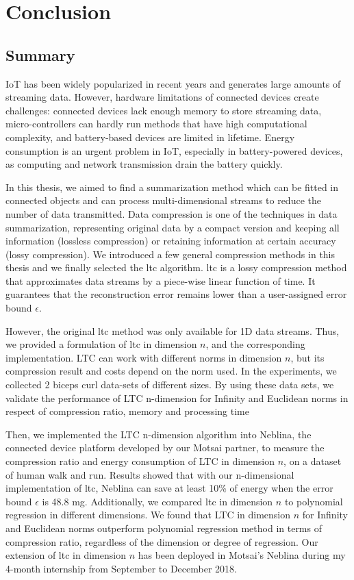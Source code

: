\chapter{Conclusion}


\section{Summary}


IoT has been widely popularized in recent years and generates large amounts of
streaming data. However, hardware limitations of connected devices create
challenges: connected devices lack enough memory to store streaming data,
micro-controllers can hardly run methods that have high computational
complexity, and battery-based devices are limited in lifetime. Energy
consumption is an urgent problem in IoT, especially in battery-powered devices,
as computing and network transmission drain the battery quickly.

In this thesis, we aimed to find a summarization method which can be fitted
in connected objects and can process multi-dimensional streams to reduce
the number of data transmitted. Data compression is one of the techniques
in data summarization, representing original data by a compact version and
keeping all information (lossless compression) or retaining information at
certain accuracy (lossy compression). We introduced a few general
compression methods in this thesis and we finally selected the
\acrfull{ltc} algorithm. \acrshort{ltc} is a lossy compression method that
approximates data streams by a piece-wise linear function of time. It
guarantees that the reconstruction error remains lower than a user-assigned
error bound $\epsilon$. 

However, the original \acrshort{ltc} method was only available for 1D data
streams. Thus, we provided a formulation of \acrshort{ltc} in dimension $n$, and
the corresponding implementation. LTC can work with different norms in dimension
$n$, but its compression result and costs depend on the norm used. In the
experiments, we collected 2 biceps curl data-sets of different sizes. By using
these data sets, we validate the performance of LTC n-dimension for Infinity and
Euclidean norms in respect of compression ratio, memory and processing time

Then, we implemented the LTC n-dimension algorithm into Neblina, the connected
device platform developed by our Motsai partner, to measure the compression
ratio and energy consumption of LTC in dimension $n$, on a dataset of human walk
and run. Results showed that with our n-dimensional implementation of
\acrshort{ltc}, Neblina can save at least 10\% of energy when the error bound
$\epsilon$ is 48.8 mg. Additionally, we compared \acrshort{ltc} in dimension $n$
to polynomial regression in different dimensions. We found that LTC in dimension
$n$ for Infinity and Euclidean norms outperform polynomial regression method in
terms of compression ratio, regardless of the dimension or degree of regression.
Our extension of \acrshort{ltc} in dimension $n$ has been deployed in Motsai's
Neblina during my 4-month internship from September to December 2018.

